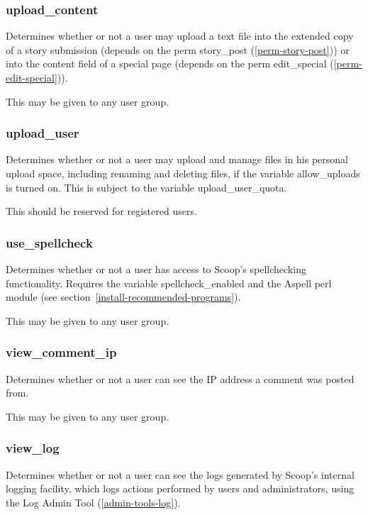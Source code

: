 \subsubsection{upload\_content}
\label{perm-upload-content}

Determines whether or not a user may upload a text file into the extended copy of a story submission (depends on the perm story\_post (\ref{perm-story-post})) or into the content field of a special page (depends on the perm edit\_special (\ref{perm-edit-special})).

This may be given to any user group.

\subsubsection{upload\_user}
\label{perm-upload-user}

Determines whether or not a user may upload and manage files in his personal upload space, including renaming and deleting files, if the variable allow\_uploads is turned on.  This is subject to the variable upload\_user\_quota.

This should be reserved for registered users.

\subsubsection{use\_spellcheck}
\label{perm-use-spellcheck}

Determines whether or not a user has access to Scoop's spellchecking functionality.  Requires the variable spellcheck\_enabled and the Aspell perl module (see section~\ref{install-recommended-programs}).

This may be given to any user group.

\subsubsection{view\_comment\_ip}
\label{perm-view-comment-ip}

Determines whether or not a user can see the IP address a comment was posted from.

This may be given to any user group.

\subsubsection{view\_log}
\label{perm-view-log}

Determines whether or not a user can see the logs generated by Scoop's internal logging facility, which logs actions performed by users and administrators, using the Log Admin Tool (\ref{admin-tools-log}).

